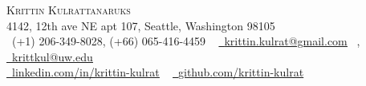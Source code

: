 \documentclass[letterpaper,11pt]{article}
\begin{document}

\begin{center}
    {\Huge \scshape Krittin Kulrattanaruks} \\ \vspace{1pt}
    4142, 12th ave NE apt 107, Seattle, Washington 98105 \\ \vspace{1pt}
    \small \raisebox{-0.1\height}\faPhone\ (+1) 206-349-8028, (+66) 065-416-4459 ~ \href{mailto:krittin.kulrat@gmail.com}{\raisebox{-0.2\height}\faEnvelope\  \underline{krittin.kulrat@gmail.com}}~ , \href{mailto:krittkul@uw.edu}{\raisebox{-0.2\height} ~\underline{krittkul@uw.edu}} 
    \\ \vspace{1pt} \href{https://www.linkedin.com/in/krittin-kulrat/}{\raisebox{-0.2\height}\faLinkedin\ \underline{linkedin.com/in/krittin-kulrat}}  ~
    \href{https://github.com/krittin-kulrat}{\raisebox{-0.2\height}\faGithub\ \underline{github.com/krittin-kulrat}}
    \vspace{-8pt}
\end{center}


\end{document}
